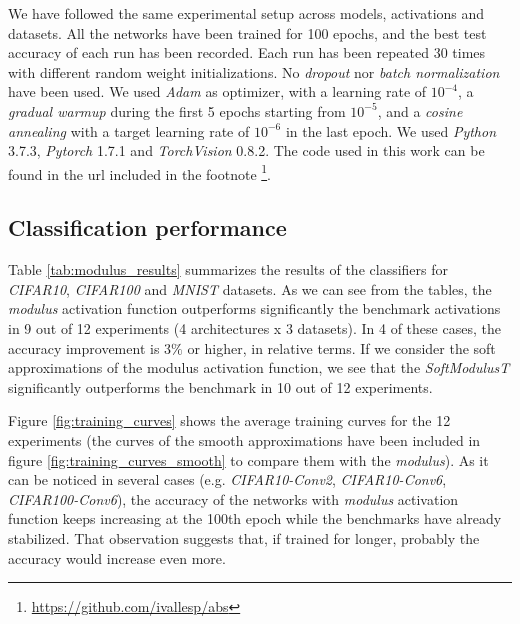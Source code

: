 We have followed the same experimental setup across models, activations and datasets. All the networks have been trained for 100 epochs, and the best test accuracy of each run has been recorded. Each run has been repeated 30 times with different random weight initializations. No \textit{dropout} \cite{srivastava2014} nor \textit{batch normalization} \cite{ioffe2015} have been used. We used \textit{Adam} \cite{kingma14} as optimizer, with a learning rate of $10^{-4}$, a \textit{gradual warmup} \cite{gotmare2018} during the first 5 epochs starting from $10^{-5}$, and a \textit{cosine annealing} \cite{loshchilov2017} with a target learning rate of $10^{-6}$ in the last epoch. We used \textit{Python} 3.7.3, \textit{Pytorch} 1.7.1 and  \textit{TorchVision} 0.8.2. The code used in this work can be found in the url included in the footnote \footnote{\url{https://github.com/ivallesp/abs}}.


\subsection{Classification performance}
Table \ref{tab:modulus_results} summarizes the results of the classifiers for \textit{CIFAR10}, \textit{CIFAR100} and \textit{MNIST} datasets. As we can see from the tables, the \textit{modulus} activation function outperforms significantly the benchmark activations in 9 out of 12 experiments (4 architectures x 3 datasets). In 4 of these cases, the accuracy improvement is $3\%$ or higher, in relative terms. If we consider the soft approximations of the modulus activation function, we see that the \textit{SoftModulusT} significantly outperforms the benchmark in 10 out of 12 experiments.

Figure \ref{fig:training_curves} shows the average training curves for the 12 experiments (the curves of the smooth approximations have been included in figure \ref{fig:training_curves_smooth} to compare them with the \textit{modulus}). As it can be noticed in several cases (e.g. \textit{CIFAR10-Conv2}, \textit{CIFAR10-Conv6}, \textit{CIFAR100-Conv6}), the accuracy of the networks with \textit{modulus} activation function keeps increasing at the 100th epoch while the benchmarks have already stabilized. That observation suggests that, if trained for longer, probably the accuracy would increase even more.


